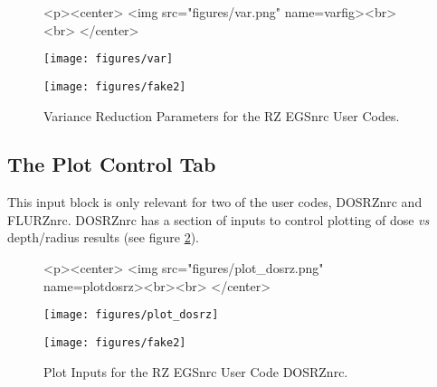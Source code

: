 \documentclass[12pt,twoside]{article}   %
\begin{document}
\begin{figure}[htb]
\begin{htmlonly}
\begin{rawhtml}
<p><center>
<img src="figures/var.png" name=varfig><br><br>
</center>
\end{rawhtml}
\end{htmlonly}
\begin{latexonly}
\begin{center}
\texttt{[image: figures/var]}
\end{center}
\end{latexonly}
\begin{center}
\texttt{[image: figures/fake2]}
\end{center}
\caption{Variance Reduction Parameters for the RZ EGSnrc User Codes.}
\label{varfig}
\end{figure}

\newpage
\subsection{The Plot Control Tab}

This input block is only relevant for two of the user codes, DOSRZnrc and FLURZnrc.
DOSRZnrc has a section of inputs to control plotting of dose {\em vs} depth/radius results
(see figure \ref{plotdosrz}).
\begin{figure}[htb]
\begin{htmlonly}
\begin{rawhtml}
<p><center>
<img src="figures/plot_dosrz.png" name=plotdosrz><br><br>
</center>
\end{rawhtml}
\end{htmlonly}
\begin{latexonly}
\begin{center}
\texttt{[image: figures/plot\_dosrz]}
\end{center}
\end{latexonly}
\begin{center}
\texttt{[image: figures/fake2]}
\end{center}
\caption{Plot Inputs for the RZ EGSnrc User Code DOSRZnrc.}
\label{plotdosrz}
\end{figure}
\end{document}
